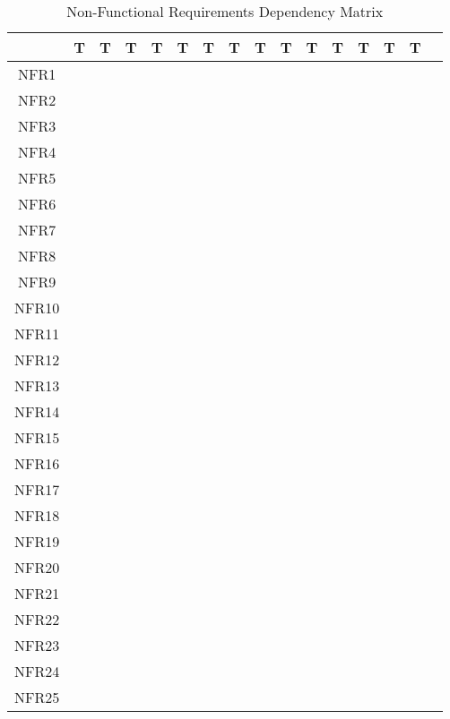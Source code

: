 \documentclass[12pt, titlepage]{article}
\begin{document}
  \begin{table}[H]
  \centering
  \caption{Non-Functional Requirements Dependency Matrix}
  \begin{tabular}{|c|c|c|c|c|c|c|c|c|c|c|c|c|c|c|c|}
  \hline
    & T & T & T & T & T & T & T & T & T & T & T & T & T & T\\
  \hline
  NFR1      & & & & & & & & & & & & & & \\ 
  \hline
  NFR2      & & & & & & & & & & & & & & \\ 
  \hline
  NFR3      & & & & & & & & & & & & & & \\ 
  \hline
  NFR4      & & & & & & & & & & & & & & \\ 
  \hline
  NFR5      & & & & & & & & & & & & & & \\ 
  \hline
  NFR6      & & & & & & & & & & & & & & \\ 
  \hline
  NFR7      & & & & & & & & & & & & & & \\ 
  \hline
  NFR8      & & & & & & & & & & & & & & \\ 
  \hline
  NFR9      & & & & & & & & & & & & & & \\ 
  \hline
  NFR10      & & & & & & & & & & & & & & \\ 
  \hline
  NFR11      & & & & & & & & & & & & & & \\ 
  \hline
  NFR12      & & & & & & & & & & & & & & \\ 
  \hline
  NFR13      & & & & & & & & & & & & & & \\ 
  \hline
  NFR14      & & & & & & & & & & & & & & \\ 
  \hline
  NFR15      & & & & & & & & & & & & & & \\ 
  \hline
  NFR16      & & & & & & & & & & & & & & \\ 
  \hline
  NFR17      & & & & & & & & & & & & & & \\ 
  \hline
  NFR18      & & & & & & & & & & & & & & \\ 
  \hline
  NFR19      & & & & & & & & & & & & & & \\ 
  \hline
  NFR20      & & & & & & & & & & & & & & \\ 
  \hline
  NFR21      & & & & & & & & & & & & & & \\ 
  \hline
  NFR22      & & & & & & & & & & & & & & \\ 
  \hline
  NFR23      & & & & & & & & & & & & & & \\ 
  \hline
  NFR24      & & & & & & & & & & & & & & \\ 
  \hline
  NFR25      & & & & & & & & & & & & & & \\ 
  \hline
  \end{tabular}
  
\label{Table:B_trace}
\end{table}
\end{document}
